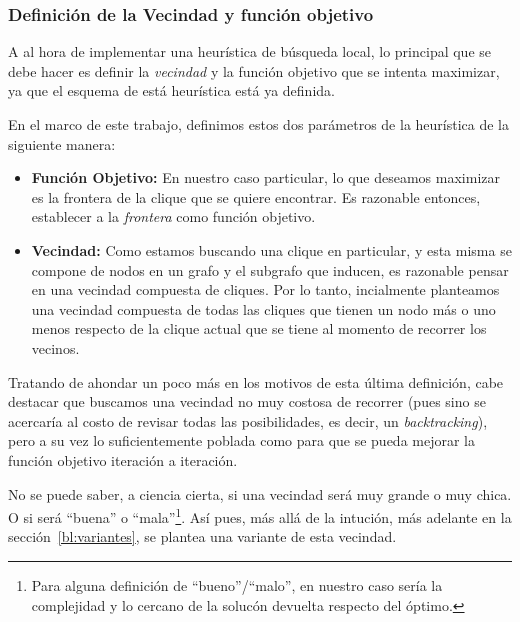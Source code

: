 \subsubsection{Definici\'on de la Vecindad y funci\'on objetivo}
\par A al hora de implementar una heur\'istica de b\'usqueda local, lo principal
    que se debe hacer es definir la \emph{vecindad} y la funci\'on objetivo que
    se intenta maximizar, ya que el esquema de est\'a heur\'istica est\'a ya definida.

\par En el marco de este trabajo, definimos estos dos par\'ametros de
    la heur\'istica de la siguiente manera:

\begin{itemize}
    \item \textbf{Funci\'on Objetivo:} En nuestro caso particular, lo que
        deseamos maximizar es la frontera de la clique que se quiere
        encontrar. Es razonable entonces, establecer a la \emph{frontera}
        como funci\'on objetivo.

    \item \textbf{Vecindad:\label{bl:vecindad}} Como estamos buscando una clique en particular,
        y esta misma se compone de nodos en un grafo y el subgrafo que inducen,
        es razonable pensar en una vecindad compuesta de cliques. Por lo tanto,
        incialmente planteamos una vecindad compuesta de todas las cliques
        que tienen un nodo m\'as o uno menos respecto de la clique actual que
        se tiene al momento de recorrer los vecinos.
\end{itemize}

\par Tratando de ahondar un poco m\'as en los motivos de esta \'ultima
    definici\'on, cabe destacar que buscamos una vecindad no muy costosa
    de recorrer (pues sino se acercar\'ia al costo de revisar todas las
    posibilidades, es decir, un \emph{backtracking}), pero a su vez lo
    suficientemente poblada como para que se pueda mejorar la funci\'on
    objetivo iteraci\'on a iteraci\'on.

\par No se puede saber, a ciencia cierta, si una vecindad ser\'a muy grande
    o muy chica. O si ser\'a ``buena'' o ``mala''\footnote{Para alguna definici\'on
    de ``bueno''/``malo'', en nuestro caso ser\'ia la complejidad y lo
    cercano de la soluc\'on devuelta respecto del \'optimo.}. As\'i pues,
    m\'as all\'a de la intuci\'on, m\'as adelante en la secci\'on~\ref{bl:variantes},
    \emph{} se plantea una variante de esta vecindad.


